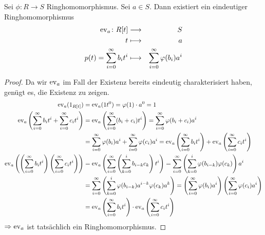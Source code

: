 \documentclass[12pt,a4paper]{scrartcl}
\begin{document}
\begin{satz}\label{thm:unieig_polyring}
	Sei $\phi\colon R\to S$ Ringhomomorphismus. Sei $a\in S$. Dann existiert ein eindeutiger Ringhomomorphismus
	\begin{eqnarray*}
		\operatorname{ev}_a\colon R[t] & \longrightarrow & S\\
		t & \longmapsto & a\\
		p(t )= \sum_{i = 0}^{\infty}b_it^i & \longmapsto& \sum_{i = 0}^{\infty} \varphi(b_i)a^i
	\end{eqnarray*}
	
\end{satz}

\begin{proof}
	Da wir $\operatorname{ev}_a$ im Fall der Existenz bereits eindeutig charakterisiert haben, genügt es, die Existenz zu zeigen.
	\begin{align*}
		\operatorname{ev}_a(1_{R[t]}) &= \operatorname{ev}_a(1t^0) = \varphi(1)\cdot a^0 = 1 \\
		\operatorname{ev}_a\left(\sum_{i= 0}^{\infty}b_it^i + \sum_{i = 0}^{\infty}c_it^i\right) &= \operatorname{ev}_a\left(\sum_{i= 0}^{\infty}(b_i+c_i)t^i\right)  = \sum_{i = 0}^{\infty} \varphi(b_i+c_i)a^i \\
		&= \sum_{i = 0}^{\infty} \varphi(b_i)a^i +\sum_{i=0}^{\infty}\varphi(c_i)a^i=\operatorname{ev}_a\left(\sum_{i=0}^{\infty}b_it^i\right) + \operatorname{ev}_a \left(\sum_{i = 0}^{\infty} c_it^i\right) \\
		\operatorname{ev}_a\left(\left(\sum_{i = 0}^{\infty}b_it^i\right)\left(\sum_{i = 0}^{\infty}c_it^i\right)\right) &= \operatorname{ev}_a\left(\sum_{i = 0}^{\infty}\left(\sum_{k = 0}^{i} b_{i-k}c_k\right)t^i\right) = \sum_{i = 0}^{\infty} \left(\sum_{k = 0}^{i}\varphi(b_{i-k})\varphi(c_k)\right)a^i \\
		&= \sum_{i = 0}^{\infty} \left(\sum_{k = 0}^{i}\varphi(b_{i-k})a^{i-k}\varphi(c_k)a^k\right) = \left(\sum_{i = 0}^{\infty} \varphi(b_i)a^i\right)\left(\sum_{i = 0}^{\infty}\varphi(c_i)a^i\right)\\
		& = \operatorname{ev}_a\left(\sum_{i = 0}^{\infty}b_it^i\right)\cdot \operatorname{ev}_a\left(\sum_{i = 0}^{\infty}c_it^i\right)
	\end{align*}
	$\Rightarrow \operatorname{ev}_a$ ist tatsächlich ein Ringhomomorphismus.
\end{proof}
\end{document}
